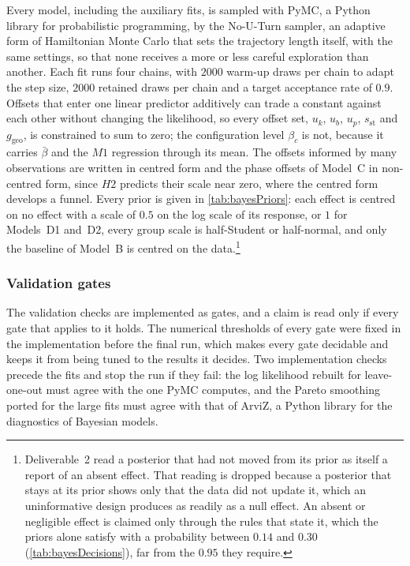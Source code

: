 Every model, including the auxiliary fits, is sampled with PyMC\autocite{abrilplaPyMCModernComprehensive2023}, a Python library for probabilistic programming, by the No-U-Turn sampler\autocite{hoffmanNoUTurnSamplerAdaptively2014}, an adaptive form of Hamiltonian Monte Carlo that sets the trajectory length itself, with the same settings, so that none receives a more or less careful exploration than another. Each fit runs four chains, with $2000$ warm-up draws per chain to adapt the step size, $2000$ retained draws per chain and a target acceptance rate of $0.9$. Offsets that enter one linear predictor additively can trade a constant against each other without changing the likelihood, so every offset set, $u_k$, $u_b$, $u_p$, $s_{\text{st}}$ and $g_{\text{geo}}$, is constrained to sum to zero; the configuration level $\beta_c$ is not, because it carries $\bar\beta$ and the $M1$ regression through its mean. The offsets informed by many observations are written in centred form and the phase offsets of Model~C in non-centred form, since $H2$ predicts their scale near zero, where the centred form develops a funnel. Every prior is given in \autoref{tab:bayesPriors}: each effect is centred on no effect with a scale of $0.5$ on the log scale of its response, or $1$ for Models~D1 and~D2, every group scale is half-Student or half-normal, and only the baseline of Model~B is centred on the data.\footnote{Deliverable~2 read a posterior that had not moved from its prior as itself a report of an absent effect. That reading is dropped because a posterior that stays at its prior shows only that the data did not update it, which an uninformative design produces as readily as a null effect. An absent or negligible effect is claimed only through the rules that state it, which the priors alone satisfy with a probability between $0.14$ and $0.30$ (\autoref{tab:bayesDecisions}), far from the $0.95$ they require.}

\subsubsection{Validation gates}

The validation checks are implemented as gates, and a claim is read only if every gate that applies to it holds. The numerical thresholds of every gate were fixed in the implementation before the final run, which makes every gate decidable and keeps it from being tuned to the results it decides. Two implementation checks precede the fits and stop the run if they fail: the log likelihood rebuilt for leave-one-out must agree with the one PyMC computes, and the Pareto smoothing ported for the large fits must agree with that of ArviZ\autocite{kumarArviZUnifiedLibrary2019}, a Python library for the diagnostics of Bayesian models.

